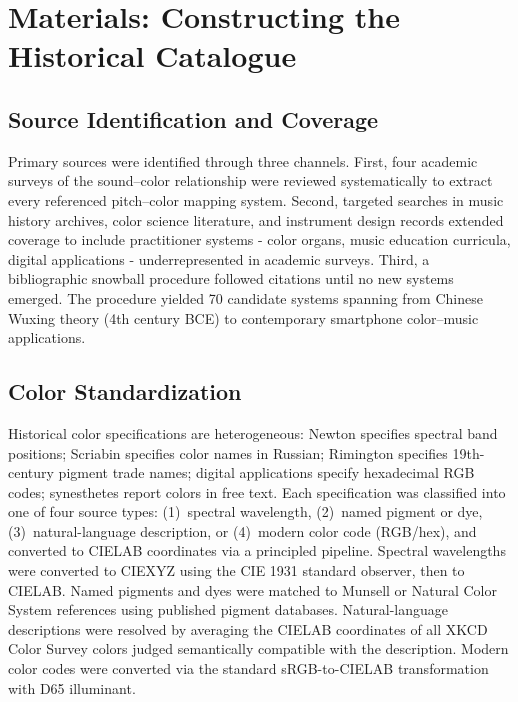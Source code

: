 \documentclass[12pt]{article}
\begin{document}
\section{Materials: Constructing the Historical Catalogue}

\subsection{Source Identification and Coverage}
Primary sources were identified through three channels. First, four
academic surveys of the sound--color relationship
\citep{jewanski2009,gage1999,peacock1988,wells1980} were reviewed
systematically to extract every referenced pitch--color mapping system.
Second, targeted searches in music history archives, color science
literature, and instrument design records extended coverage to include
practitioner systems - color organs, music education curricula, digital
applications - underrepresented in academic surveys. Third, a
bibliographic snowball procedure followed citations until no new systems
emerged. The procedure yielded 70 candidate systems spanning from
Chinese Wuxing theory (4th century BCE) to contemporary smartphone
color--music applications.

\subsection{Color Standardization}
Historical color specifications are heterogeneous: Newton specifies
spectral band positions; Scriabin specifies color names in Russian;
Rimington specifies 19th-century pigment trade names; digital
applications specify hexadecimal RGB codes; synesthetes report colors
in free text. Each specification was classified into one of four source
types: (1)~spectral wavelength, (2)~named pigment or dye,
(3)~natural-language description, or (4)~modern color code (RGB/hex),
and converted to CIELAB coordinates via a principled pipeline. Spectral
wavelengths were converted to CIEXYZ using the CIE 1931 standard
observer, then to CIELAB. Named pigments and dyes were matched to
Munsell \citep{newhall1943} or Natural Color System
\citep{hard1981} references using published pigment databases.
Natural-language descriptions were resolved by averaging the CIELAB
coordinates of all XKCD Color Survey \citep{munroe2010xkcd} colors
judged semantically compatible with the description. Modern color codes
were converted via the standard sRGB-to-CIELAB transformation with D65
illuminant.
\end{document}
